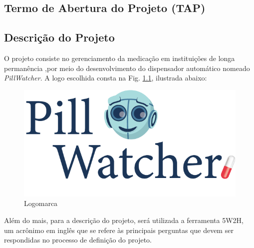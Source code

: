 \begin{apendicesenv}
\partapendices
\chapter{Termo de Abertura do Projeto (TAP)}
\label{ATP_app}
\section{Descrição do Projeto}

O projeto consiste no gerenciamento da medicação em instituições de longa permanência ,por meio do  desenvolvimento do dispensador automático nomeado \textit{PillWatcher}. A logo escolhida consta na Fig. \ref{fig:logo}, ilustrada abaixo:


\begin{figure}[H]
    \centering
    \includegraphics[scale=2]{figuras/gerenciamento/pillwatcher_logo.png}
    \caption{Logomarca}
    \label{fig:logo}
\end{figure}

Além do mais, para a descrição do projeto, será utilizada a ferramenta 5W2H, um acrônimo em inglês que se refere às principais perguntas que devem ser respondidas no processo de definição do projeto. 


\end{apendicesenv}
